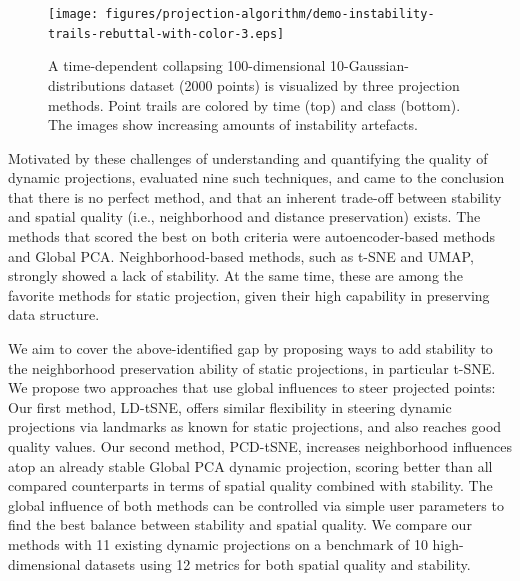 
\begin{figure}[h]
 \centering
 \texttt{[image: figures/projection-algorithm/demo-instability-trails-rebuttal-with-color-3.eps]}
 \caption{A time-dependent collapsing 100-dimensional 10-Gaussian-distributions dataset (2000 points) is visualized by three projection methods. Point trails are colored by time (top) and class (bottom). The images show increasing amounts of instability artefacts.}
 \label{fig:demo-instability}
 \vspace{-0.15cm}
\end{figure}

Motivated by these challenges of understanding and quantifying the quality of dynamic projections, \cite{Vernier2020} evaluated nine such techniques, and came to the conclusion that there is no perfect method, and that an inherent trade-off between stability and spatial quality (i.e., neighborhood and distance preservation) exists. The methods that scored the best on both criteria were autoencoder-based methods and Global PCA. Neighborhood-based methods, such as t-SNE and UMAP, strongly showed a lack of stability. At the same time, these are among the favorite methods for static projection, given their high capability in preserving data structure.

We aim to cover the above-identified gap by proposing ways to add stability to the neighborhood preservation ability of static projections, in particular t-SNE. We propose two approaches that use global influences to steer projected points:
Our first method, LD-tSNE, offers similar flexibility in steering dynamic projections via landmarks as known for static projections, and also reaches good quality values. Our second method, PCD-tSNE, increases neighborhood influences atop an already stable Global PCA dynamic projection, scoring better than all compared counterparts in terms of spatial quality combined with stability. The global influence of both methods can be controlled via simple user parameters to find the best balance between stability and spatial quality. We compare our methods with 11 existing dynamic projections on a benchmark of 10 high-dimensional datasets using 12 metrics for both spatial quality and stability. 

